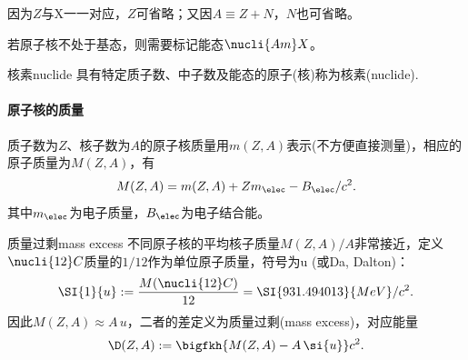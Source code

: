 \begin{remark}
	因为$Z$与X一一对应，$Z$可省略；又因$A\equiv Z+N$，$N$也可省略。
\end{remark}

\begin{remark}
	若原子核不处于基态，则需要标记能态$\nucli{Am}X$。
\end{remark}

\begin{definition}{核素}{nuclide}
	具有特定质子数、中子数及能态的原子(核)称为核素(nuclide).
\end{definition}

\paragraph{原子核的质量}质子数为$Z$、核子数为$A$的原子核质量用$m(Z,A)$表示(不方便直接测量)，相应的原子质量为$M(Z,A)$，有
\begin{equation}
	M(Z,A)=m(Z,A)+Zm_\elec-B_\elec/c^2.
\end{equation}
其中$m_\elec$为电子质量，$B_\elec$为电子结合能。

\begin{definition}{质量过剩}{mass excess}
	不同原子核的平均核子质量$M(Z,A)/A$非常接近，定义$\nucli{12}C$质量的$1/12$作为单位原子质量，符号为u (或Da, Dalton)：
	\begin{equation}
		\SI{1}{u}:=\frac{M(\nucli{12}C)}{12}=\SI{931.494013}{MeV}/c^2.
	\end{equation}
	因此$M(Z,A)\approx A\,\si{u}$，二者的差定义为质量过剩(mass excess)，对应能量
	\begin{align}
		\D(Z,A):=\bigfkh{M(Z,A)-A\,\si{u}}c^2.
	\end{align}
\end{definition}
